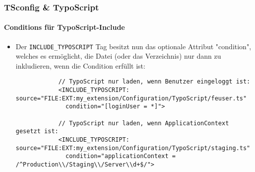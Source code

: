 %
\begin{frame}[fragile]
	\frametitle{TSconfig \& TypoScript}
	\framesubtitle{Conditions für TypoScript-Include}

	\lstset{basicstyle=\tiny\ttfamily}

	\begin{itemize}
		\item Der \texttt{INCLUDE\_TYPOSCRIPT} Tag besitzt nun das optionale Attribut "condition",
			welches es ermöglicht, die Datei (oder das Verzeichnis) nur dann zu inkludieren,
			wenn die Condition erfüllt ist:

		\begin{lstlisting}
			// TypoScript nur laden, wenn Benutzer eingeloggt ist:
			<INCLUDE_TYPOSCRIPT: source="FILE:EXT:my_extension/Configuration/TypoScript/feuser.ts"
			  condition="[loginUser = *]">

			// TypoScript nur laden, wenn ApplicationContext gesetzt ist:
			<INCLUDE_TYPOSCRIPT: source="FILE:EXT:my_extension/Configuration/TypoScript/staging.ts"
			  condition="applicationContext = /^Production\\/Staging\\/Server\\d+$/">
		\end{lstlisting}

	\end{itemize}

\end{frame}

